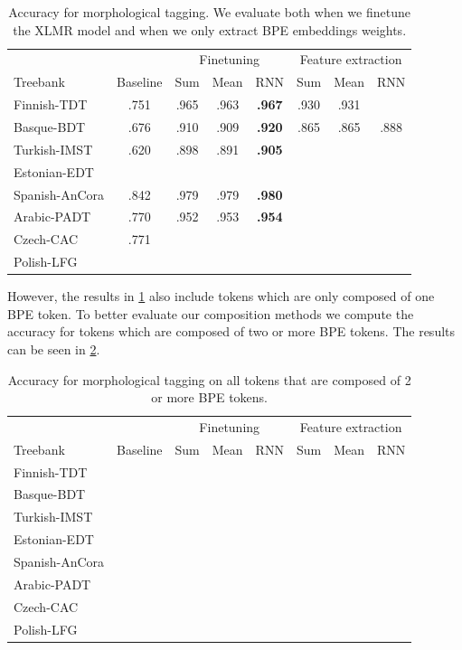 \documentclass[11pt]{article}
\begin{document}
	\begin{table}[h]
	\centering
	\begin{tabular}{l|c|ccc|ccc}
		& & \multicolumn{3}{c}{Finetuning} & \multicolumn{3}{c}{Feature extraction} \\
		Treebank & Baseline & Sum & Mean & RNN & Sum & Mean & RNN \\
		\hline
		Finnish-TDT & .751 & .965 & .963 & \textbf{.967} & .930 & .931 &\\ 
		Basque-BDT & .676 & .910 & .909 & \textbf{.920} & .865 & .865 & .888 \\
		Turkish-IMST & .620 & .898 & .891 & \textbf{.905} &  &  &\\
		Estonian-EDT & & & & & & & \\
		Spanish-AnCora & .842 & .979 & .979 & \textbf{.980} &  &  &\\
		Arabic-PADT & .770 & .952 & .953&\textbf{.954} &  &  &\\
		Czech-CAC & .771 &  &  &  &  &  &\\
		Polish-LFG & & & & &  &  &\\
	\end{tabular}
	\caption{\label{tab:results_tokens} Accuracy for morphological tagging. We evaluate both when we finetune the XLMR model and when we only extract BPE embeddings weights.}
	\end{table}

	However, the results in \cref{tab:results_tokens} also include tokens which are only composed of one BPE token. To better evaluate our composition methods we compute the accuracy for tokens which are composed of two or more BPE tokens. The results can be seen in \cref{tab:results_large_tokens}.

	\begin{table}[h]
	\centering
	\begin{tabular}{l|c|ccc|ccc}
		& & \multicolumn{3}{c}{Finetuning} & \multicolumn{3}{c}{Feature extraction} \\
		Treebank & Baseline & Sum & Mean & RNN & Sum & Mean & RNN \\
		\hline
		Finnish-TDT & & & & & & & \\ 
		Basque-BDT & & & & & & & \\
		Turkish-IMST & & & & & & & \\
		Estonian-EDT & & & & & & & \\
		Spanish-AnCora & & & & & & & \\
		Arabic-PADT & & & & & & & \\
		Czech-CAC & & & & & & & \\
		Polish-LFG & & & & & & & \\
	\end{tabular}
	\caption{\label{tab:results_large_tokens} Accuracy for morphological tagging on all tokens that are composed of 2 or more BPE tokens.}
\end{table}
\end{document}
